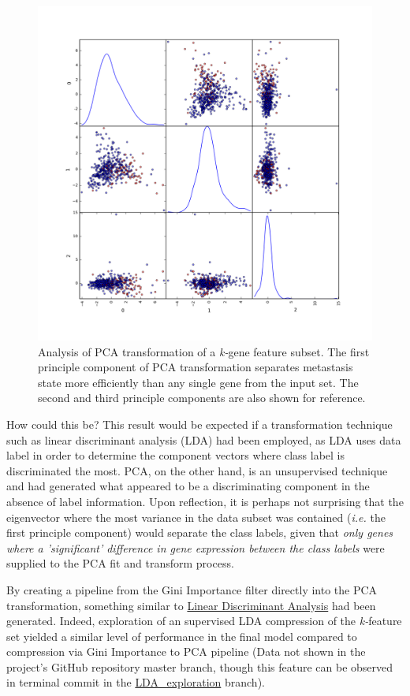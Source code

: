 \documentclass[final]{article}
\begin{document}
\begin{figure}[h!]
  \centering
  \includegraphics[scale = 0.5]{pcaScatter}
  \caption{\label{fig:pcaScatter}Analysis of PCA transformation of a \textit{k-}gene feature subset.  The first principle component of PCA transformation separates metastasis state more efficiently than any single gene from the input set.  The second and third principle components are also shown for reference.}
\end{figure}

How could this be?  This result would be expected if a transformation technique
such as linear discriminant analysis (LDA) had been employed, as LDA uses data
label in order to determine the component vectors where class label is
discriminated the most.  PCA, on the other hand, is an unsupervised technique
and had generated what appeared to be a discriminating component in the absence of
label information.  Upon reflection, it is perhaps not surprising that
the eigenvector where the most variance in the data subset was contained (\textit{i.e.}
the first principle component) would separate the class labels, given that
\textit{only genes where a 'significant' difference in gene expression between the
class labels} were supplied to the PCA fit and transform process.

By creating a pipeline from the  Gini Importance filter directly into the PCA
transformation, something similar to
\href{http://scikit-learn.org/0.16/modules/generated/sklearn.lda.LDA.html}{Linear
Discriminant Analysis} had been generated.  Indeed, exploration of an supervised
LDA compression of the \textit{k-}feature set yielded a similar level of
performance in the final model compared to compression via Gini Importance to
PCA pipeline (Data not shown in  the project's GitHub repository master branch,
though this feature can be observed in terminal commit in the
\href{https://github.com/CCThompson82/MLE_capstone/commit/d9b0c14ebe69603381b52093cb0ea35b0ca3b3b7}{LDA\_exploration}
branch).
\end{document}
